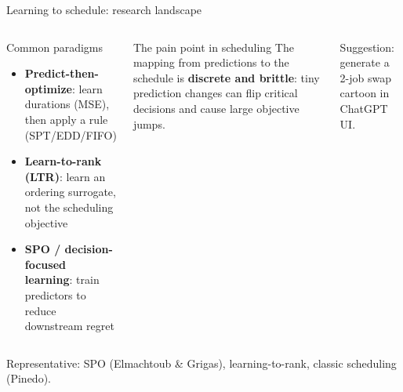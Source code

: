 \documentclass[aspectratio=169,10pt]{beamer}
\newcommand{\btext}[1]{\textbf{\color{darkred}#1}}
\begin{document}
\begin{frame}{Learning to schedule: research landscape}
  \begin{columns}[T]
      \begin{block}{Common paradigms}
        \begin{itemize}
          \item \btext{Predict-then-optimize}: learn durations (MSE), then apply a rule (SPT/EDD/FIFO)
          \item \btext{Learn-to-rank (LTR)}: learn an ordering surrogate, not the scheduling objective
          \item \btext{SPO / decision-focused learning}: train predictors to reduce downstream regret
        \end{itemize}
      \end{block}

      \begin{block}{The pain point in scheduling}
        The mapping from predictions to the schedule is \btext{discrete and brittle}:
        tiny prediction changes can flip critical decisions and cause large objective jumps.
      \end{block}

      \centering
      \vspace{0.1cm}
      \scriptsize
      Suggestion: generate a 2-job swap cartoon in ChatGPT UI.
  \end{columns}

  \vspace{0.1cm}
  \scriptsize
  \color{darkgray}
  Representative: SPO (Elmachtoub \& Grigas), learning-to-rank, classic scheduling (Pinedo).
\end{frame}
\end{document}

